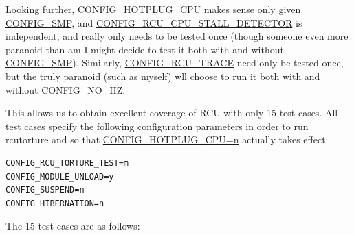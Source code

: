 Looking further, \url{CONFIG_HOTPLUG_CPU} makes sense only
given \url{CONFIG_SMP}, and \url{CONFIG_RCU_CPU_STALL_DETECTOR}
is independent, and really only needs to be tested once (though someone
even more paranoid than am I might decide to test it both with
and without \url{CONFIG_SMP}).
Similarly, \url{CONFIG_RCU_TRACE} need only be tested once,
but the truly paranoid (such as myself) wll choose to run it both with
and without \url{CONFIG_NO_HZ}.

This allows us to obtain excellent coverage of RCU with only 15
test cases.
All test cases specify the following configuration parameters in order
to run rcutorture and so that \url{CONFIG_HOTPLUG_CPU=n} actually
takes effect:

\vspace{5pt}
\begin{minipage}[t]{\columnwidth}
\small
\begin{verbatim}
CONFIG_RCU_TORTURE_TEST=m
CONFIG_MODULE_UNLOAD=y
CONFIG_SUSPEND=n
CONFIG_HIBERNATION=n
\end{verbatim}
\end{minipage}
\vspace{5pt}

The 15 test cases are as follows:

